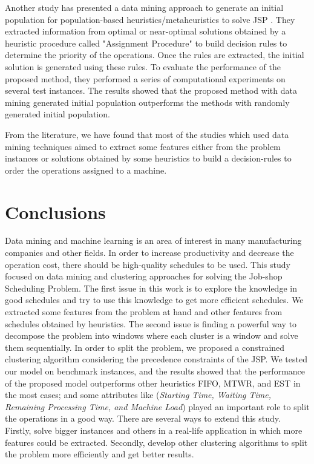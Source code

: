 \documentclass[runningheads]{llncs}
\begin{document}
Another study has presented a data mining approach to generate an initial population for population-based heuristics/metaheuristics to solve JSP \cite{nasiri2019data}. They extracted information from optimal or near-optimal solutions obtained by a heuristic procedure called "Assignment Procedure" to build decision rules to determine the priority of the operations. Once the rules are extracted, the initial solution is generated using these rules. To evaluate the performance of the proposed method, they performed a series of computational experiments on several test instances. The results showed that the proposed method with data mining generated initial population outperforms the methods with randomly generated initial population.

From the literature, we have found that most of the studies which used data mining techniques aimed to extract some features either from the problem instances or solutions obtained by some heuristics to build a decision-rules to order the operations assigned to a machine.


\section{Conclusions}
\label{sec:conclusions}
Data mining and machine learning is an area of interest in many manufacturing companies and other fields. In order to increase productivity and decrease the operation cost, there should be high-quality schedules to be used. This study focused on data mining and clustering approaches for solving the Job-shop Scheduling Problem. The first issue in this work is to explore the knowledge in good schedules and try to use this knowledge to get more efficient schedules. We extracted some features from the problem at hand and other features from schedules obtained by heuristics. The second issue is finding a powerful way to decompose the problem into windows where each cluster is a window and solve them sequentially. In order to split the problem, we proposed a constrained clustering algorithm considering the precedence constraints of the JSP. We tested our model on benchmark instances, and the results showed that the performance of the proposed model outperforms other heuristics FIFO, MTWR, and EST in the most cases; and some attributes like (\textit{Starting Time, Waiting Time, Remaining Processing Time, and Machine Load}) played an important role to split the operations in a good way. There are several ways to extend this study. Firstly, solve bigger instances and others in a real-life application in which more features could be extracted. Secondly, develop other clustering algorithms to split the problem more efficiently and get better results.



\end{document}
